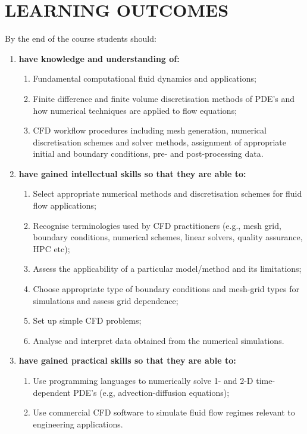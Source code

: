 \documentclass[12pts,a4paper,amsmath,amssymb,floatfix]{article}%
\begin{document}
\section{LEARNING OUTCOMES}
By the end of the course students should:
\begin{enumerate}[{\bf A.}]
\item {\bf have knowledge and understanding of:}
  \begin{enumerate}
    \item Fundamental computational fluid dynamics and applications;
    \item Finite difference and finite volume discretisation methods of PDE's and how numerical techniques are applied to flow equations;
    \item CFD workflow procedures including mesh generation, numerical discretisation schemes and solver methods, assignment of appropriate initial and boundary conditions, pre- and post-processing data.
  \end{enumerate}
%
\item {\bf have gained intellectual skills so that they are able to:}
  \begin{enumerate}
    \item Select appropriate numerical methods and discretisation schemes for fluid flow applications;
    \item Recognise terminologies used by CFD practitioners (e.g., mesh grid, boundary conditions, numerical schemes, linear solvers, quality assurance, HPC etc);
    \item Assess the applicability of a particular model/method and its limitations;
    \item Choose appropriate type of boundary conditions and mesh-grid types for simulations and assess grid dependence;
    \item Set up simple CFD problems;
    \item Analyse and interpret data obtained from the numerical simulations.
  \end{enumerate}
%
\item {\bf have gained practical skills so that they are able to:}
  \begin{enumerate}
    \item Use programming languages to numerically solve 1- and 2-D time-dependent PDE's (e.g, advection-diffusion equations);
    \item Use commercial CFD software to simulate fluid flow regimes relevant to engineering applications.
  \end{enumerate}

\end{enumerate}
\end{document}
